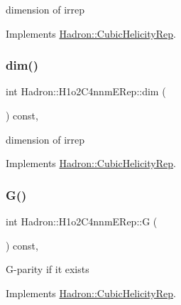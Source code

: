 dimension of irrep 

Implements \mbox{\hyperlink{structHadron_1_1CubicHelicityRep_a95d229a05580e65f8bdde74a1e316855}{Hadron\+::\+Cubic\+Helicity\+Rep}}.

\mbox{\label{structHadron_1_1H1o2C4nnmERep_a5143b2b23d7dcc59df93fe4f3bb0222c}} 
\subsubsection{\texorpdfstring{dim()}{dim()}\hspace{0.1cm}{\footnotesize\ttfamily [3/3]}}
{\footnotesize\ttfamily int Hadron\+::\+H1o2\+C4nnm\+E\+Rep\+::dim (\begin{DoxyParamCaption}{ }\end{DoxyParamCaption}) const\hspace{0.3cm}{\ttfamily [inline]}, {\ttfamily [virtual]}}

dimension of irrep 

Implements \mbox{\hyperlink{structHadron_1_1CubicHelicityRep_a95d229a05580e65f8bdde74a1e316855}{Hadron\+::\+Cubic\+Helicity\+Rep}}.

\mbox{\label{structHadron_1_1H1o2C4nnmERep_a5ff5cb2d786f5befca7638a9dcaf3f14}} 
\subsubsection{\texorpdfstring{G()}{G()}\hspace{0.1cm}{\footnotesize\ttfamily [1/3]}}
{\footnotesize\ttfamily int Hadron\+::\+H1o2\+C4nnm\+E\+Rep\+::G (\begin{DoxyParamCaption}{ }\end{DoxyParamCaption}) const\hspace{0.3cm}{\ttfamily [inline]}, {\ttfamily [virtual]}}

G-\/parity if it exists 

Implements \mbox{\hyperlink{structHadron_1_1CubicHelicityRep_a50689f42be1e6170aa8cf6ad0597018b}{Hadron\+::\+Cubic\+Helicity\+Rep}}.

\mbox{\label{structHadron_1_1H1o2C4nnmERep_a5ff5cb2d786f5befca7638a9dcaf3f14}} 
